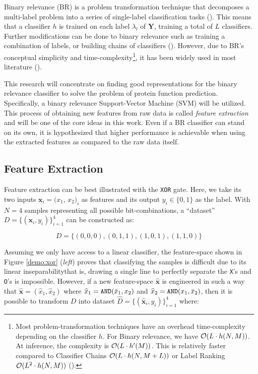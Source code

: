 \par Binary relevance (BR) is a problem transformation technique that
decomposes a multi-label problem into a series of single-label classification
tasks (\cite{boutell2004learning, tsoumakas2007multilabel}). This means that a
classifier $h$ is trained on each label $\lambda_l$ of $\mathbf{Y}$, training
a total of $L$ classifiers. Further modifications can be done to binary
relevance such as training a combination of labels, or building chains of
classifiers (\cite{read2009classifier}). However, due to BR's conceptual
simplicity and time-complexity\footnote[2]{
    Most problem-transformation techniques have an overhead time-complexity
    depending on the classifier $h$. For Binary relevance, we have $\mathcal{O}(L
    \cdot h(N, M))$. At inference, the complexity is $\mathcal{O}(L
    \cdot h'(M))$. This is relatively faster compared to Classifier Chains
    $\mathcal{O}(L \cdot h(N, M + L))$ or Label Ranking $\mathcal{O}(L^{2} \cdot h(N, M))$
    (\cite{zhang2014review}).
}, it has been widely used
in most literature (\cite{zhang2017binary}).

\par This research will concentrate on finding good representations for the
binary relevance classifier to solve the problem of protein function
prediction. Specifically, a binary relevance Support-Vector Machine (SVM) will
be utilized. This process of obtaining new features from raw data is called 
\textit{feature extraction} and will be one of the core ideas in this work. Even
if a BR classifier can stand on its own, it is hypothesized that higher
performance is achievable when using the extracted features as compared to the
raw data itself.

\subsection{Feature Extraction}

\par Feature extraction can be best illustrated with the \texttt{XOR} gate.
Here, we take its two inputs $\mathbf{x}_{i} = (x_{1}$, $x_{2})_{i}$ as features
and its output $y_{i} \in \{0,1\}$ as the label. With $N=4$ samples
representing all possible bit-combinations, a ``dataset''
$D=\{(\mathbf{x}_{i}, y_{i})\}_{i=1}^{4}$ can be constructed as:

\[
    D = \{(0,0,0), (0,1,1), (1,0,1), (1,1,0)\}
\]

Assuming we only have access to a linear classifier, the feature-space shown
in Figure  \ref{demo:xor} (\textit{left}) proves that classifying the samples is
difficult due to its linear inseparability\textemdash that is, drawing a single
line to perfectly separate the \texttt{X}'s and \texttt{O}'s is impossible.
However, if a new feature-space $\mathbf{\widehat{x}}$ is engineered in such a
way that $\mathbf{\widehat{x}} = (\widehat{x}_{1}, \widehat{x}_2)$ where 
$\widehat{x}_{1} = \text{\texttt{AND}}(\bar{x}_{1}, x_{2})$ and $\widehat{x}_{2}
= \text{\texttt{AND}}(x_{1}, \bar{x}_{2})$, then it is possible to transform $D$
into dataset $\widehat{D}=\{(\mathbf{\widehat{x}}_{i}, y_{i})\}_{i=1}^{4}$
where:

